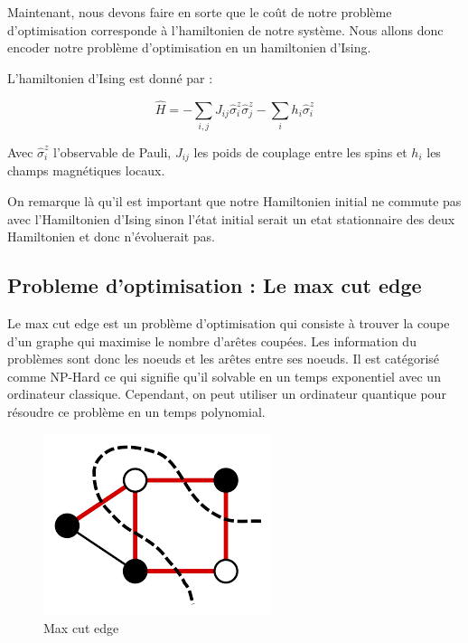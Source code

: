 \documentclass{article}
\begin{document}
\begin{multicols}{2}
Maintenant, nous devons faire en sorte que le coût de notre problème d'optimisation corresponde à l'hamiltonien de notre système.
Nous allons donc encoder notre problème d'optimisation en un hamiltonien d'Ising.

L'hamiltonien d'Ising est donné par :

\begin{equation}
    \hat{H} = -\sum_{i,j} J_{ij}\hat{\sigma}_i^z\hat{\sigma}_j^z - \sum_i h_i\hat{\sigma}_i^z
\end{equation}

Avec $\hat{\sigma}_i^z$ l'observable de Pauli, $J_{ij}$ les poids de couplage entre les spins et $h_i$ les champs magnétiques locaux.


On remarque là qu'il est important que notre Hamiltonien initial ne commute pas avec l'Hamiltonien d'Ising sinon l'état initial serait un etat stationnaire des deux Hamiltonien et donc n'évoluerait pas.




\subsection{Probleme d'optimisation : Le max cut edge}

Le max cut edge est un problème d'optimisation qui consiste à trouver la coupe d'un graphe qui maximise le nombre d'arêtes coupées.
Les information du problèmes sont donc les noeuds et les arêtes entre ses noeuds. 
Il est catégorisé comme NP-Hard ce qui signifie qu'il solvable en un temps exponentiel avec un ordinateur classique. 
Cependant, on peut utiliser un ordinateur quantique pour résoudre ce problème en un temps polynomial.

\begin{figure}[H]
    \centering
    \includegraphics[width = \columnwidth]{fig/Max_Cut.png}
    \caption{Max cut edge}
    \label{fig:Max_cut_edge}
\end{figure}


\end{multicols}
\end{document}
